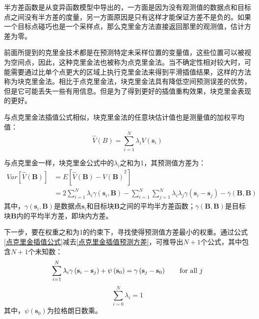 半方差函数是从变异函数模型中导出的，一方面是因为没有观测值的数据点和目标点之间没有半方差的度量，另一方面原因是只有这样才能保证方差不是负的。如果一个目标点碰巧也是一个采样点，那么克里金方法直接返回那里的观测值，估计方差为零。

前面所提到的克里金技术都是在预测特定未采样位置的变量值，这些位置可以被视为空间点，因此，这种克里金法也被称为点克里金法。当不确定性相对较大时，可能需要通过比单个点更大的区域上执行克里金法来得到平滑插值结果，这样的方法称为块克里金法。相比于点克里金法，块克里金法具有降低空间预测误差的优势，但是它可能丢失一些有用信息。但是为了得到更好的插值重构效果，块克里金表现的更好。

与点克里金法插值公式相似，块克里金法的任意块估计值也是测量值的加权平均值：
\begin{equation}
    \hat{V}\left( B \right) = \sum_{i=1}^{N} \lambda_{i} V \left( \mathbf{s}_{i} \right)
    \label{块克里金插值公式}
\end{equation}

与点克里金一样，块克里金公式中的$ \lambda_{i} $之和为1，其预测值方差为：
\begin{equation}
    \begin{split}
        Var\left[ \hat{V} \left( \mathbf{B} \right) \right]
        & = E\left[ {\hat{V}\left( \mathbf{B} \right) - V\left( \mathbf{B} \right)}^{2} \right]     \\
        & = 2 \sum_{i=1}^{N} \lambda_{i} \gamma\left( \mathbf{s}_{i} , \mathbf{B} \right) - \sum_{i=1}^{N} \sum_{j=1}^{N} \lambda_{i} \lambda_{j} \gamma\left( \mathbf{s}_{i} - \mathbf{s}_{j} \right) - \overline{\gamma} \left( \mathbf{B}, \mathbf{B} \right)
    \end{split}
    \label{块克里金插值预测方差}
\end{equation}
其中，$ \gamma\left( \mathbf{s}_{i} , \mathbf{B} \right) $是数据点$ \mathbf{s}_{i} $和目标块$ \mathbf{B} $之间的平均半方差函数；$ \overline{\gamma} \left( \mathbf{B}, \mathbf{B} \right) $是目标块$ \mathbf{B} $内的平均半方差，即块内方差。

下一步，要在权重之和为1的约束下，寻找使得预测值方差最小的权重。通过公式\ref{点克里金插值公式}减去\ref{点克里金插值预测方差}，可推导出$ N+1 $个公式，其中包含$ N+1 $个未知数：
\begin{equation}
    \sum_{i=1}^{N} \lambda_{i} \gamma \left( \mathbf{s}_{i} - \mathbf{s}_{j} \right) + \psi \left( \mathbf{s}_{0} \right) = \gamma \left( \mathbf{s}_{j} - \mathbf{s}_{0} \right) \qquad \text{for all $ j $}
    \label{点克里金法N个方程}
\end{equation}
\begin{equation}
    \sum_{i=0}^{N}\lambda_{i} = 1
    \label{点克里金法N+1个方程}
\end{equation}
其中，$ \psi \left( \mathbf{s}_{0} \right) $为拉格朗日数乘。

